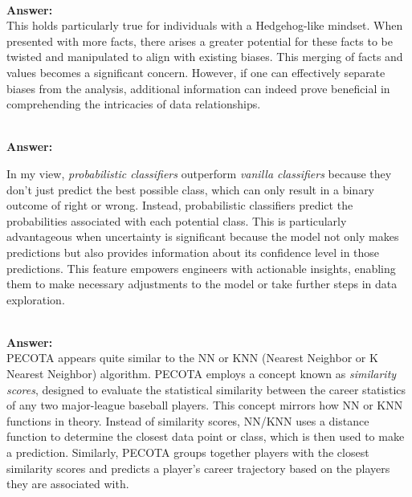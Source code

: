 \documentclass[12pt]{article}
\begin{document}
\begin{enumerate}
 \\
\textbf{Answer: } \\ 

This holds particularly true for individuals with a Hedgehog-like mindset. When presented with more facts, there arises a greater potential for these facts to be twisted and manipulated to align with existing biases. This merging of facts and values becomes a significant concern. However, if one can effectively separate biases from the analysis, additional information can indeed prove beneficial in comprehending the intricacies of data relationships.

 \\
\textbf{Answer: }

In my view, \textit{probabilistic classifiers} outperform \textit{vanilla classifiers} because they don't just predict the best possible class, which can only result in a binary outcome of right or wrong. Instead, probabilistic classifiers predict the probabilities associated with each potential class. This is particularly advantageous when uncertainty is significant because the model not only makes predictions but also provides information about its confidence level in those predictions. This feature empowers engineers with actionable insights, enabling them to make necessary adjustments to the model or take further steps in data exploration.

 \\
\textbf{Answer: } \\ 

PECOTA appears quite similar to the NN or KNN (Nearest Neighbor or K Nearest Neighbor) algorithm. PECOTA employs a concept known as \textit{similarity scores}, designed to evaluate the statistical similarity between the career statistics of any two major-league baseball players. This concept mirrors how NN or KNN functions in theory. Instead of similarity scores, NN/KNN uses a distance function to determine the closest data point or class, which is then used to make a prediction. Similarly, PECOTA groups together players with the closest similarity scores and predicts a player's career trajectory based on the players they are associated with. \\


\end{enumerate}
\end{document}
